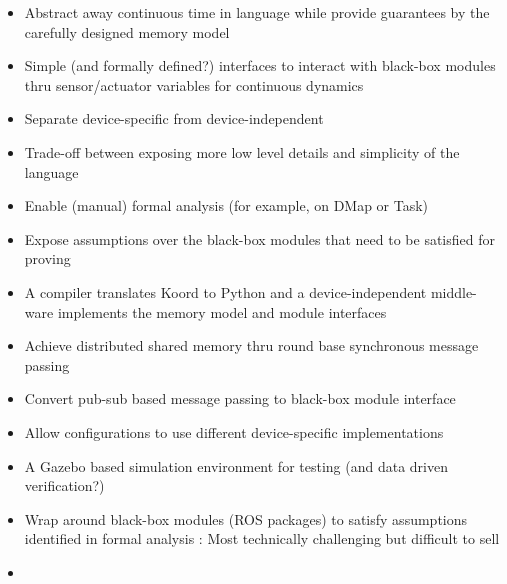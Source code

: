 \begin{itemize}
\item Abstract away continuous time in language while provide guarantees by the carefully designed memory model
\item Simple (and formally defined?) interfaces to interact with black-box modules thru sensor/actuator variables for continuous dynamics
\item Separate device-specific from device-independent
\item Trade-off between exposing more low level details and simplicity of the language
\item Enable (manual) formal analysis (for example, on DMap or Task)
\item Expose assumptions over the black-box modules that need to be satisfied for proving
\item  A compiler translates Koord to Python and a device-independent middle-ware implements the memory model and module interfaces
\item Achieve distributed shared memory thru round base synchronous message passing
\item Convert pub-sub based message passing to black-box module interface
\item Allow configurations to use different device-specific implementations
\item A Gazebo based simulation environment for testing (and data driven verification?)
\item Wrap around black-box modules (ROS packages) to satisfy assumptions identified in formal analysis : Most technically challenging but difficult to sell
\item {}

\end{itemize}

%
%
%


